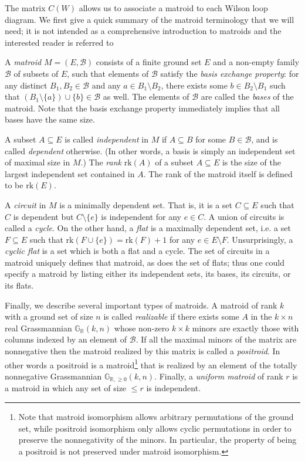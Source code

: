 \documentclass[11pt]{article}
\newcommand{\R}{\mathbb{R}}
\newcommand{\Gr}{\mathbb{G}_{\R, \geq 0}}
\newcommand{\rk}{\textrm{rk} }
\newcommand{\cB}{\mathcal{B}}
\theoremstyle{remark}
\theoremstyle{definition}
\begin{document}
The matrix $C(W)$ allows us to associate a matroid to each Wilson loop diagram. We first give a quick summary of the matroid terminology that we will need; it is not intended as a comprehensive introduction to matroids and the interested reader is referred to \cite{OxleyMatroidBook} 

A {\em matroid} $M = (E,\cB)$ consists of a finite ground set $E$ and a non-empty family $\cB$ of subsets of $E$, such that elements of $\cB$ satisfy the {\em basis exchange property}: for any distinct $B_1,B_2 \in \cB$ and any $a \in B_1 \setminus B_2$, there exists some $b \in B_2 \setminus B_1$ such that $(B_1 \setminus \{a\})\cup \{b\} \in \cB$ as well. The elements of $\cB$ are called the {\em bases} of the matroid. Note that the basis exchange property immediately implies that all bases have the same size.

A subset $A \subseteq E$ is called {\em independent} in $M$ if $A \subseteq B$ for some $B \in \cB$, and is called {\em dependent} otherwise. (In other words, a basis is simply an independent set of maximal size in $M$.) The {\em rank}  $\rk(A)$ of a subset $A \subseteq E$ is the size of the largest independent set contained in $A$. The rank of the matroid itself is defined to be $\rk(E)$.

A {\em circuit} in $M$ is a minimally dependent set. That is, it is a set $C \subseteq E$ such that $C$ is dependent but $C \setminus \{e\}$ is independent for any $e \in C$. A union of circuits is called a {\em cycle}. On the other hand, a {\em flat} is a maximally dependent set, i.e. a set $F \subseteq E$ such that $\rk(F \cup \{e\}) = \rk(F) + 1$ for any $e \in E \setminus F$. Unsurprisingly, a {\em cyclic flat} is a set which is both a flat and a cycle. The set of circuits in a matroid uniquely defines that matroid, as does the set of flats; thus one could specify a matroid by listing either its independent sets, its bases, its circuits, or its flats.

Finally, we describe several important types of matroids. A matroid of rank $k$ with a ground set of size $n$ is called {\em realizable} if there exists some $A$ in the $k\times n$ real Grassmannian $\mathbb{G}_{\mathbb{R}}(k,n)$ whose non-zero $k\times k$ minors are exactly those with columns indexed by an element of $\cB$. If all the maximal minors of the matrix are nonnegative then the matroid realized by this matrix is called a {\em positroid}.  In other words a positroid is a matroid\footnote{Note that matroid isomorphism allows arbitrary permutations of the ground set, while positroid isomorphism only allows cyclic permutations in order to preserve the nonnegativity of the minors.  In particular, the property of being a positroid is not preserved under matroid isomorphism.} that is realized by an element of the totally nonnegative Grassmannian $\Gr(k,n)$. Finally, a {\em uniform matroid} of rank $r$ is a matroid in which any set of size $\leq r$ is independent.
\end{document}
